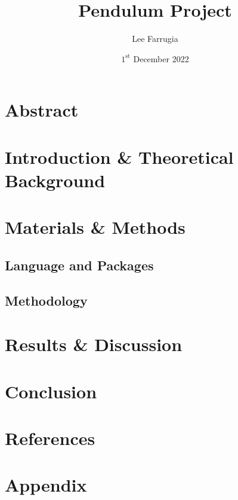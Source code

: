 \documentclass[12pt, a4paper]{article}
\title{Pendulum Project}
\date{\(1^\mathrm{{st}}\) December 2022}
\author{Lee Farrugia}
\begin{document}
    
\maketitle
\thispagestyle{titlepagestyle}
\pagestyle{mystyle}

\section{Abstract}

\begin{multicols*}{2}

\section{Introduction \& Theoretical Background}

\section{Materials \& Methods}
\subsection{Language and Packages}

\subsection{Methodology}

\section{Results \& Discussion}

\section{Conclusion}

\end{multicols*}

\section{References}
\printbibliography[heading = none]

\section{Appendix}
\begin{verbatim}

\end{verbatim}
\end{document}
